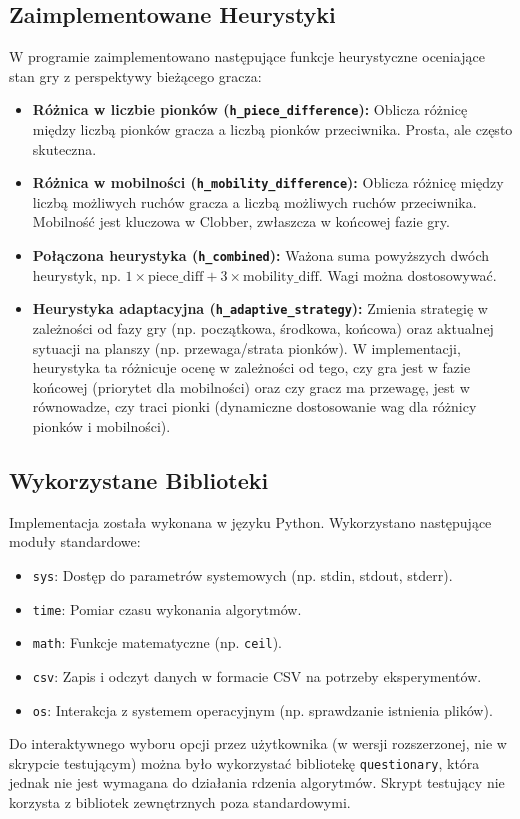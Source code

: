\documentclass[12pt,a4paper]{article}
\newcommand{\code}[1]{\texttt{#1}} %
\begin{document}
\subsection{Zaimplementowane Heurystyki}
W programie zaimplementowano następujące funkcje heurystyczne oceniające stan gry z perspektywy bieżącego gracza:
\begin{itemize}
    \item \textbf{Różnica w liczbie pionków (\code{h\_piece\_difference}):} Oblicza różnicę między liczbą pionków gracza a liczbą pionków przeciwnika. Prosta, ale często skuteczna.
    \item \textbf{Różnica w mobilności (\code{h\_mobility\_difference}):} Oblicza różnicę między liczbą możliwych ruchów gracza a liczbą możliwych ruchów przeciwnika. Mobilność jest kluczowa w Clobber, zwłaszcza w końcowej fazie gry.
    \item \textbf{Połączona heurystyka (\code{h\_combined}):} Ważona suma powyższych dwóch heurystyk, np. $1 \times \text{piece\_diff} + 3 \times \text{mobility\_diff}$. Wagi można dostosowywać.
    \item \textbf{Heurystyka adaptacyjna (\code{h\_adaptive\_strategy}):} Zmienia strategię w zależności od fazy gry (np. początkowa, środkowa, końcowa) oraz aktualnej sytuacji na planszy (np. przewaga/strata pionków). W implementacji, heurystyka ta różnicuje ocenę w zależności od tego, czy gra jest w fazie końcowej (priorytet dla mobilności) oraz czy gracz ma przewagę, jest w równowadze, czy traci pionki (dynamiczne dostosowanie wag dla różnicy pionków i mobilności).
\end{itemize}

\subsection{Wykorzystane Biblioteki}
Implementacja została wykonana w języku Python. Wykorzystano następujące moduły standardowe:
\begin{itemize}
    \item \code{sys}: Dostęp do parametrów systemowych (np. stdin, stdout, stderr).
    \item \code{time}: Pomiar czasu wykonania algorytmów.
    \item \code{math}: Funkcje matematyczne (np. \code{ceil}).
    \item \code{csv}: Zapis i odczyt danych w formacie CSV na potrzeby eksperymentów.
    \item \code{os}: Interakcja z systemem operacyjnym (np. sprawdzanie istnienia plików).
\end{itemize}
Do interaktywnego wyboru opcji przez użytkownika (w wersji rozszerzonej, nie w skrypcie testującym) można było wykorzystać bibliotekę \code{questionary}, która jednak nie jest wymagana do działania rdzenia algorytmów. Skrypt testujący nie korzysta z bibliotek zewnętrznych poza standardowymi.
\end{document}
